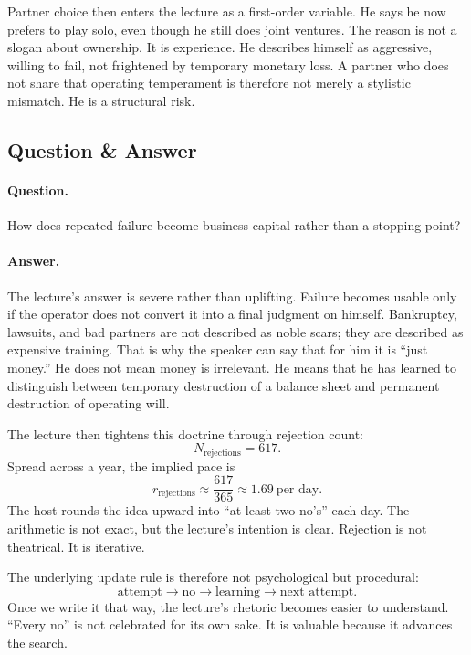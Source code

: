 Partner choice then enters the lecture as a first-order variable. He says he now prefers to play solo, even though he still does joint ventures. The reason is not a slogan about ownership. It is experience. He describes himself as aggressive, willing to fail, not frightened by temporary monetary loss. A partner who does not share that operating temperament is therefore not merely a stylistic mismatch. He is a structural risk.

\subsection{Question \& Answer}

\paragraph{Question.}
How does repeated failure become business capital rather than a stopping point?

\paragraph{Answer.}
The lecture's answer is severe rather than uplifting. Failure becomes usable only if the operator does not convert it into a final judgment on himself. Bankruptcy, lawsuits, and bad partners are not described as noble scars; they are described as expensive training. That is why the speaker can say that for him it is ``just money.'' He does not mean money is irrelevant. He means that he has learned to distinguish between temporary destruction of a balance sheet and permanent destruction of operating will.

The lecture then tightens this doctrine through rejection count:
\begin{equation}
N_{\text{rejections}}=617.
\end{equation}
Spread across a year, the implied pace is
\begin{equation}
r_{\text{rejections}}
\approx
\frac{617}{365}
\approx
1.69\ \text{per day}.
\end{equation}
The host rounds the idea upward into ``at least two no's'' each day. The arithmetic is not exact, but the lecture's intention is clear. Rejection is not theatrical. It is iterative.

The underlying update rule is therefore not psychological but procedural:
\begin{equation}
\text{attempt}\to \text{no}\to \text{learning}\to \text{next attempt}.
\end{equation}
Once we write it that way, the lecture's rhetoric becomes easier to understand. ``Every no'' is not celebrated for its own sake. It is valuable because it advances the search.


